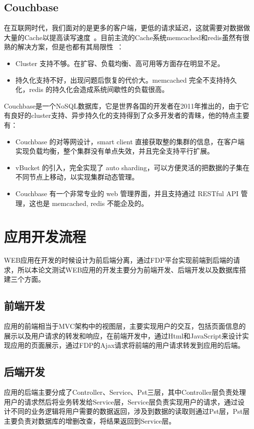 \subsection{Couchbase}
在互联网时代，我们面对的是更多的客户端，更低的请求延迟，这就需要对数据做大量的Cache以提高读写速度~\cite{brown2012getting}。目前主流的Cache系统memcached和redis虽然有很熟的解决方案，但是也都有其局限性~\cite{kovacs2013cassandra}：
\begin{itemize}
\item Cluster 支持不够。在扩容、负载均衡、高可用等方面存在明显不足。
\item 持久化支持不好，出现问题后恢复的代价大。memcached 完全不支持持久化，redis 的持久化会造成系统间歇性的负载很高。
\end{itemize}
Couchbase是一个NoSQL数据库，它是世界各国的开发者在2011年推出的，由于它有良好的cluster支持、异步持久化的支持得到了众多开发者的青睐，他的特点主要有：
\begin{itemize}
\item Couchbase 的对等网设计，smart client 直接获取整的集群的信息，在客户端实现负载均衡，整个集群没有单点失效，并且完全支持平行扩展。
\item vBucket 的引入，完全实现了 auto sharding，可以方便灵活的把数据的子集在不同节点上移动，以实现集群动态管理。
\item Couchbase 有一个非常专业的 web 管理界面，并且支持通过 RESTful API 管理，这也是 memcached, redis 不能企及的。
\end{itemize}
\section{应用开发流程}
WEB应用在开发的时候设计为前后端分离，通过FDP平台实现前端到后端的请求，所以本论文测试WEB应用的开发主要分为前端开发、后端开发以及数据库搭建三个方面。
\subsection{前端开发}
应用的前端相当于MVC架构中的视图层，主要实现用户的交互，包括页面信息的展示以及用户请求的转发和响应，在前端开发中，通过Html和JavaScript来设计实现应用的页面展示，通过FDP的Ajax请求将前端的用户请求转发到应用的后端。
\subsection{后端开发}
应用的后端主要分成了Controller、Service、Pst三层，其中Controller层负责处理用户的请求然后将业务转发给Service层，Service层负责实现用户的请求，通过设计不同的业务逻辑将用户需要的数据返回，涉及到数据的读取则通过Pst层，Pst层主要负责对数据库的增删改查，将结果返回到Service层。
